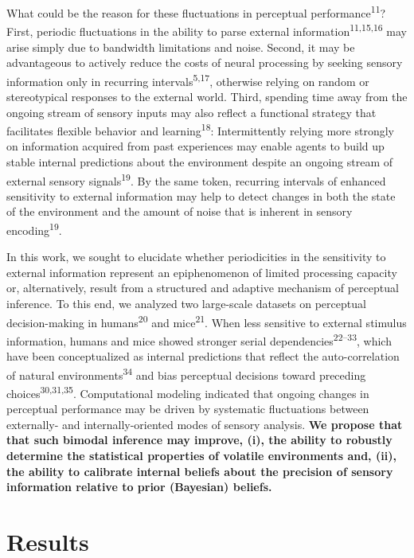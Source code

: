 \documentclass[
]{article}
\begin{document}
What could be the reason for these fluctuations in perceptual
performance\textsuperscript{11}? First, periodic fluctuations in the
ability to parse external information\textsuperscript{11,15,16} may
arise simply due to bandwidth limitations and noise. Second, it may be
advantageous to actively reduce the costs of neural processing by
seeking sensory information only in recurring
intervals\textsuperscript{5,17}, otherwise relying on random or
stereotypical responses to the external world. Third, spending time away
from the ongoing stream of sensory inputs may also reflect a functional
strategy that facilitates flexible behavior and
learning\textsuperscript{18}: Intermittently relying more strongly on
information acquired from past experiences may enable agents to build up
stable internal predictions about the environment despite an ongoing
stream of external sensory signals\textsuperscript{19}. By the same
token, recurring intervals of enhanced sensitivity to external
information may help to detect changes in both the state of the
environment and the amount of noise that is inherent in sensory
encoding\textsuperscript{19}.

In this work, we sought to elucidate whether periodicities in the
sensitivity to external information represent an epiphenomenon of
limited processing capacity or, alternatively, result from a structured
and adaptive mechanism of perceptual inference. To this end, we analyzed
two large-scale datasets on perceptual decision-making in
humans\textsuperscript{20} and mice\textsuperscript{21}. When less
sensitive to external stimulus information, humans and mice showed
stronger serial dependencies\textsuperscript{22--33}, which have been
conceptualized as internal predictions that reflect the auto-correlation
of natural environments\textsuperscript{34} and bias perceptual
decisions toward preceding choices\textsuperscript{30,31,35}.
Computational modeling indicated that ongoing changes in perceptual
performance may be driven by systematic fluctuations between externally-
and internally-oriented modes of sensory analysis. \textbf{We propose
that that such bimodal inference may improve, (i), the ability to
robustly determine the statistical properties of volatile environments
and, (ii), the ability to calibrate internal beliefs about the precision
of sensory information relative to prior (Bayesian) beliefs.}

\hypertarget{results}{%
\section{Results}\label{results}}
\end{document}
